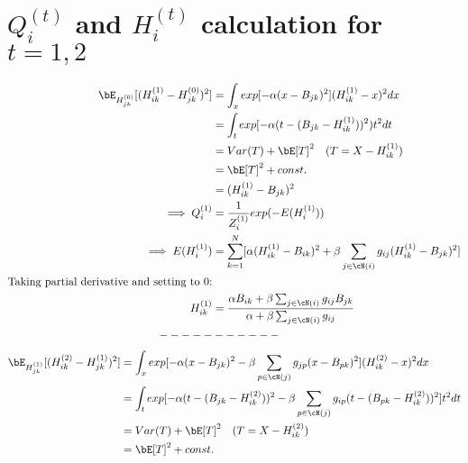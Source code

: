 \section*{$Q_i^{(t)}$ and $H_i^{(t)}$ calculation for $t=1,2$}
\begin{align*}
\bE_{H_{jk}^{(0)}}[(H_{ik}^{(1)} - H_{jk}^{(0)})^2] &= \int_{x} exp[-\alpha(x - B_{jk})^2 ](H_{ik}^{(1)}-x)^2dx\\
 &=\int_{t} exp[-\alpha(t - (B_{jk} - H_{ik}^{(1)}))^2)t^2dt\\
 &=Var(T) + \bE[T]^2  \hspace{10pt}\text{($T = X - H_{ik}^{(1)}$)}\\
 &= \bE[T]^2 + const.\\
 &= (H_{ik}^{(1)} - B_{jk})^2\\
 \implies Q_i^{(1)} &= \frac{1}{Z_{i}^{(1)}}exp(-E(H_i^{(1)}))\\
 \implies E(H_i^{(1)}) &= \sum_{k=1}^{N}[\alpha(H_{ik}^{(1)} - B_{ik})^2 + \beta\sum_{j\in\cN(i)}g_{ij}(H_{ik}^{(1)} - B_{jk})^2]\\
 \text{Taking partial derivative and setting to 0:}\\
 H_{ik}^{(1)} &= \frac{\alpha B_{ik} +  \beta\sum_{j\in\cN(i)}g_{ij}B_{jk}}{\alpha + \beta\sum_{j\in\cN(i)}g_{ij}}\\
 ----- & ------\\
 \end{align*}
\begin{align*}
 \bE_{H_{jk}^{(1)}}[(H_{ik}^{(2)} - H_{jk}^{(1)})^2] &= \int_{x} exp[-\alpha(x - B_{jk})^2 - \beta\sum_{p\in\cN(j)}g_{jp}(x - B_{pk})^2](H_{ik}^{(2)}-x)^2dx\\
        &=\int_{t} exp[-\alpha(t - (B_{jk} - H_{ik}^{(2)}))^2 - \beta\sum_{p\in\cN(j)}g_{ip}(t  - (B_{pk} -H_{ik}^{(2)}))^2]t^2dt\\
 &=Var(T) + \bE[T]^2  \hspace{10pt}\text{($T = X - H_{ik}^{(2)}$)}\\
 &= \bE[T]^2 + const.\\
\end{align*}
\newpage

